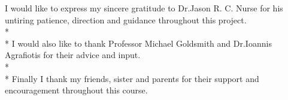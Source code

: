 \begin{acknowledgements}
I would like to express my sincere gratitude to Dr.Jason R. C. Nurse for his untiring patience, direction and guidance throughout this project.\\*\\*
I would also like to thank Professor Michael Goldsmith and Dr.Ioannis Agrafiotis for their advice and input. \\*\\*
Finally I thank my friends, sister and parents for their support and encouragement throughout this course. 
\end{acknowledgements}